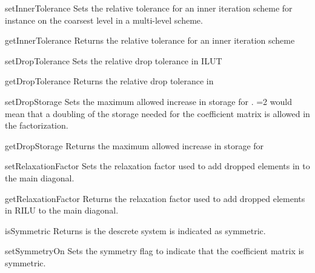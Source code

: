 \begin{methoddesc}[SolverOptions]{setInnerTolerance}{}
Sets the relative tolerance for an inner iteration scheme for instance
on the coarsest level in a multi-level scheme.
\end{methoddesc}

\begin{methoddesc}[SolverOptions]{getInnerTolerance}{}
Returns the relative tolerance for an inner iteration scheme
\end{methoddesc}

\begin{methoddesc}[SolverOptions]{setDropTolerance}{}
Sets the relative drop tolerance in ILUT
\end{methoddesc}

\begin{methoddesc}[SolverOptions]{getDropTolerance}{}
Returns the relative drop tolerance in \ILUT
\end{methoddesc}


\begin{methoddesc}[SolverOptions]{setDropStorage}{}
Sets the maximum allowed increase in storage for \ILUT. =2 would mean that a doubling of the storage needed for the coefficient matrix is allowed in the \ILUT factorization.
\end{methoddesc}

\begin{methoddesc}[SolverOptions]{getDropStorage}{}
Returns the maximum allowed increase in storage for \ILUT
\end{methoddesc}

\begin{methoddesc}[SolverOptions]{setRelaxationFactor}{}
Sets the relaxation factor used to add dropped elements in \RILU to the main diagonal.
\end{methoddesc}

\begin{methoddesc}[SolverOptions]{getRelaxationFactor}{}
Returns the relaxation factor used to add dropped elements in RILU to the main diagonal.
\end{methoddesc}

\begin{methoddesc}[SolverOptions]{isSymmetric}{}
Returns \True is the descrete system is indicated as symmetric.
\end{methoddesc}

\begin{methoddesc}[SolverOptions]{setSymmetryOn}{}
Sets the symmetry flag to indicate that the coefficient matrix is symmetric.
\end{methoddesc}

